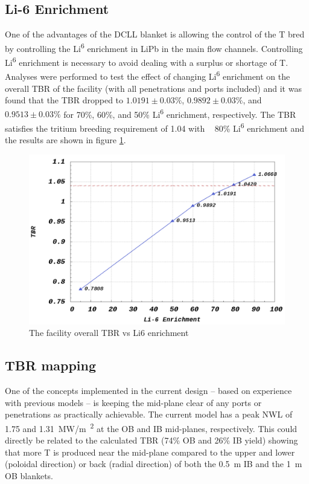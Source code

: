 \documentclass[12pt, letterpaper]{elsarticle}
\begin{document}
\subsection{Li-6 Enrichment} \label{Li-6 Enrichment}
One of the advantages of the DCLL blanket is allowing the control of the T bred by controlling the  Li\textsuperscript{6} enrichment in LiPb in the main flow channels. Controlling Li\textsuperscript{6} enrichment is necessary to avoid dealing with a surplus or shortage of T. Analyses were performed to test the effect of changing Li\textsuperscript{6} enrichment on the overall TBR of the facility (with all penetrations and ports included) and it was found that the TBR dropped to $1.0191\pm 0.03\%$, $0.9892\pm 0.03\%$, and $0.9513\pm 0.03\%$ for 70\%, 60\%, and 50\% Li\textsuperscript{6} enrichment, respectively. The TBR satisfies the tritium breeding requirement of 1.04 with ~ 80\% Li\textsuperscript{6} enrichment and the results are shown in figure \ref{fig:Li6_enrichment}.
\begin{figure}[h!]
  \centering
  \includegraphics[scale=0.2]{../plots/Li6_enrichment.png}
  \caption{The facility overall TBR vs Li6 enrichment}
  \label{fig:Li6_enrichment}
\end{figure}

\subsection{TBR mapping} \label{TBR mapping}
One of the concepts implemented in the current design – based on experience with previous models – is keeping the mid-plane clear of any ports or penetrations as practically achievable. The current model has a peak NWL of 1.75 and \SI{1.31}{MW/m\textsuperscript{2}} at the OB and IB mid-planes, respectively. This could directly be related to the calculated TBR (74\% OB and 26\% IB yield) showing that more T is produced near the mid-plane compared to the upper and lower (poloidal direction) or back (radial direction) of both the \SI{0.5}{m} IB and the \SI{1}{m} OB blankets.\vspace{5mm}
\end{document}
